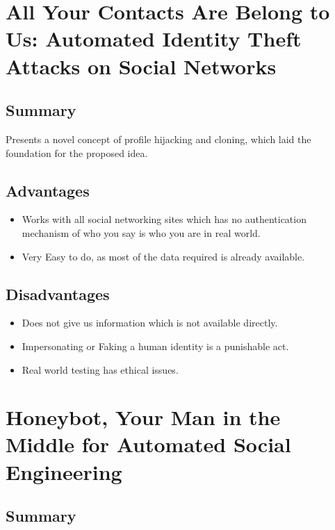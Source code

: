 
\section{All Your Contacts Are Belong to Us: Automated Identity Theft Attacks on Social Networks}
\subsection{Summary}

Presents a novel concept of profile hijacking and cloning, which laid the
foundation for the proposed idea.

\subsection{Advantages}
\begin{itemize}
\item{Works with all social networking sites which has no authentication mechanism of who you say is who you are in real world.}
\item{Very Easy to do, as most of the data required is already available.}

\end{itemize}

\subsection{Disadvantages}
\begin{itemize}
\item{Does not give us information which is not available directly.}
\item{Impersonating or Faking a human identity is a punishable act.}
\item{Real world testing has ethical issues.}

\end{itemize}


\section{Honeybot, Your Man in the Middle for Automated Social Engineering}
\subsection{Summary}

